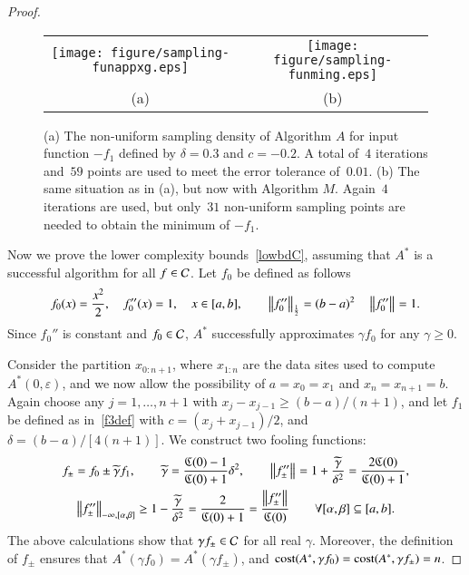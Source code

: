 \documentclass[review]{elsarticle}
\newcommand{\abstol}{\varepsilon}
\theoremstyle{definition}
\newcommand{\tgamma}{\widetilde{\gamma}}
\begin{document}
\begin{proof}
\begin{figure}[t]
\begin{tabular}{cc}	
		 \texttt{[image: figure/sampling-funappxg.eps]}
		&\texttt{[image: figure/sampling-funming.eps]}
		\\ (a) & (b)
		\end{tabular}
		\caption{(a) The non-uniform sampling density of Algorithm $A$ for input function
$-f_1$ defined by $\delta = 0.3$ and $c = -0.2$. A total of~$4$ iterations
and~$59$ points are used to meet the error tolerance of~$0.01$.
(b) The same situation as in (a), but now
with Algorithm $M$. Again~$4$ iterations are used, but only~$31$ non-uniform
sampling points are needed to obtain the minimum of $-f_1$. 	\label{f3foolplot}}
\end{figure}

	Now we prove the lower complexity bounds~\eqref{lowbdC}, assuming that $A^*$ is
	a successful algorithm for all $f \in \mathcal{C}$. Let $f_0$ be defined as follows
	\begin{equation}
	\label{assumpfzero}
	f_0(x) =\frac{x^2}{2}, \quad f_0''(x) = 1, \quad x \in [a,b], \qquad \norm[\frac12]{f_0''}
	= (b -a)^2  \quad \norm{f_0''} = 1.
	\end{equation}
	Since $f_0''$ is constant and $f_0 \in \mathcal{C}$,  $A^*$ successfully approximates
	$\gamma f_0$ for any  $\gamma\ge0$.
	
	Consider the partition $x_{0:n+1}$, where $x_{1:n}$ are the data sites
	used to compute $A^*(0,\abstol)$, and we now allow the possibility of $a = x_0=x_1$
	and $x_n = x_{n+1} = b$.  Again choose any $j=1, \ldots, n+1$ with $x_j-x_{j-1}
	\ge (b-a)/(n+1)$, and let $f_1$ be defined as in~\eqref{f3def} with $c =
	(x_j+x_{j-1})/2$, and $\delta = (b-a)/[4(n+1)]$. We construct two fooling
	functions:
	\begin{gather*}
	f_{\pm} = f_0 \pm \tgamma f_1, \qquad \tgamma =\frac{\fC(0)-1}{\fC(0)+1}\delta^2,
	\qquad
	\norm{f''_{\pm}} = 1+\frac{\tgamma}{\delta^2} = \frac{2\fC(0)}{\fC(0)+1} , \\
\norm[-\infty,{[\alpha,\beta]}]{f''_{\pm}} \ge 1-\frac{\tgamma}{\delta^2} = \frac{2}{\fC(0)+1}
= \frac{\norm{f''_{\pm}} }{\fC(0)} \qquad \forall [\alpha,\beta] \subseteq [a,b].
	\end{gather*}
	The above calculations show that $\gamma f_{\pm} \in \mathcal{C}$ for all real
	$\gamma$. Moreover, the definition of $f_{\pm}$ ensures that $A^*(\gamma f_0) =
	A^*(\gamma f_{\pm})$, and $\operatorname{cost}(A^*,\gamma f_0) = \operatorname{cost}(A^*,\gamma f_{\pm}) =
	n$.
	

\end{proof}
\end{document}

